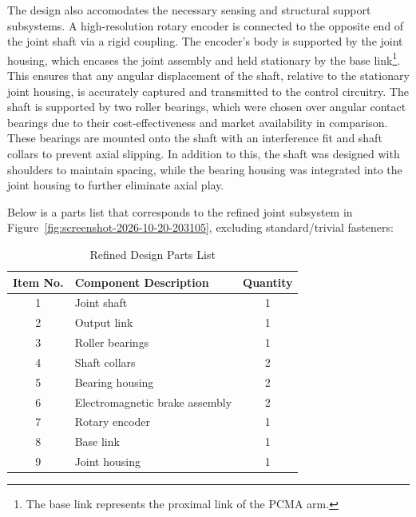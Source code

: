The design also accomodates the necessary sensing and structural support subsystems. A high-resolution rotary encoder is connected to the opposite end of the joint shaft via a rigid coupling. The encoder's body is supported by the joint housing, which encases the joint assembly and held stationary by the base link\footnote{The base link represents the proximal link of the PCMA arm.}. This ensures that any angular displacement of the shaft, relative to the stationary joint housing, is accurately captured and transmitted to the control circuitry. The shaft is supported by two roller bearings, which were chosen over angular contact bearings due to their cost-effectiveness and market availability in comparison. These bearings are mounted onto the shaft with an interference fit and shaft collars to prevent axial slipping. In addition to this, the shaft was designed with shoulders to maintain spacing, while the bearing housing was integrated into the joint housing to further eliminate axial play.

Below is a parts list that corresponds to the refined joint subsystem in Figure~\ref{fig:screenshot-2026-10-20-203105}, excluding standard/trivial fasteners:
\begin{table}[H]
	\centering
	\caption{Refined Design Parts List}
	\label{tab:parts_list}
	\begin{tabularx}{0.85\textwidth}{|c|>{\raggedright\arraybackslash}X|c|}
		\hline
		\textbf{Item No.} & \textbf{Component Description} & \textbf{Quantity} \\
		\hline
		1 & Joint shaft & 1 \\ \hline
		2 & Output link & 1 \\ \hline
		3 & Roller bearings & 1 \\ \hline
		4 & Shaft collars & 2 \\ \hline
		5 & Bearing housing & 2 \\ \hline
		6 & Electromagnetic brake assembly & 2 \\ \hline
		7 & Rotary encoder & 1 \\ \hline
		8 & Base link & 1 \\ \hline
		9 & Joint housing & 1 \\
		\hline
	\end{tabularx}
\end{table}
